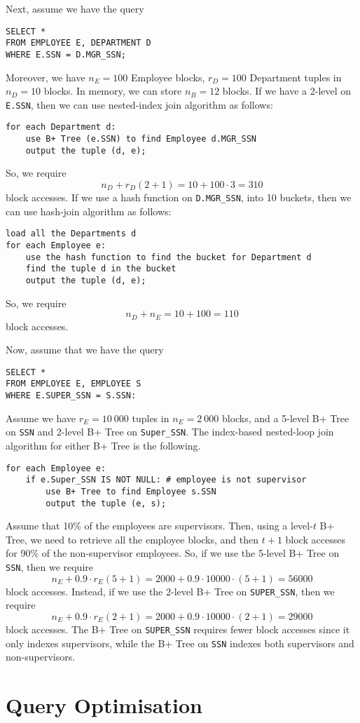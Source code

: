 \documentclass[a4paper, openany]{memoir}
\theoremstyle{definition}
\theoremstyle{plain}
\begin{document}
Next, assume we have the query
\begin{verbatim}
SELECT *
FROM EMPLOYEE E, DEPARTMENT D
WHERE E.SSN = D.MGR_SSN;
\end{verbatim}
Moreover, we have $n_E = 100$ Employee blocks, $r_D = 100$ Department tuples in $n_D = 10$ blocks. In memory, we can store $n_B = 12$ blocks. If we have a 2-level on \texttt{E.SSN}, then we can use nested-index join algorithm as follows:
\begin{verbatim}
for each Department d:
    use B+ Tree (e.SSN) to find Employee d.MGR_SSN
    output the tuple (d, e);
\end{verbatim}
So, we require
\[n_D + r_D (2 + 1) = 10 + 100 \cdot 3 = 310\]
block accesses. If we use a hash function on \texttt{D.MGR\_SSN}, into 10 buckets, then we can use hash-join algorithm as follows:
\begin{verbatim}
load all the Departments d
for each Employee e:
    use the hash function to find the bucket for Department d
    find the tuple d in the bucket
    output the tuple (d, e);
\end{verbatim}
So, we require
\[n_D + n_E = 10 + 100 = 110\]
block accesses.

Now, assume that we have the query
\begin{verbatim}
SELECT *
FROM EMPLOYEE E, EMPLOYEE S
WHERE E.SUPER_SSN = S.SSN:
\end{verbatim}
Assume we have $r_E = 10 \ 000$ tuples in $n_E = 2 \ 000$ blocks, and a 5-level B+ Tree on \texttt{SSN} and 2-level B+ Tree on \texttt{Super\_SSN}. The index-based nested-loop join algorithm for either B+ Tree is the following.
\begin{verbatim}
for each Employee e:
    if e.Super_SSN IS NOT NULL: # employee is not supervisor
        use B+ Tree to find Employee s.SSN
        output the tuple (e, s);
\end{verbatim}
Assume that 10\% of the employees are supervisors. Then, using a level-$t$ B+ Tree, we need to retrieve all the employee blocks, and then $t+1$ block accesses for 90\% of the non-supervisor employees. So, if we use the 5-level B+ Tree on \texttt{SSN}, then we require
\[n_E + 0.9 \cdot r_E (5 + 1) = 2000 + 0.9 \cdot 10000 \cdot (5 + 1) = 56 000\]
block accesses. Instead, if we use the 2-level B+ Tree on \texttt{SUPER\_SSN}, then we require
\[n_E + 0.9 \cdot r_E (2 + 1) = 2000 + 0.9 \cdot 10000 \cdot (2 + 1) = 29 000\]
block accesses. The B+ Tree on \texttt{SUPER\_SSN} requires fewer block accesses since it only indexes supervisors, while the B+ Tree on \texttt{SSN} indexes both supervisors and non-supervisors.

\newpage

\section{Query Optimisation}
\end{document}
